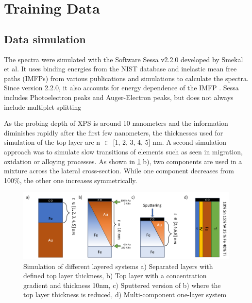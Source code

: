 

\section{Training Data}
\label{train_data}


\subsection{Data simulation}

The spectra were simulated with the Software Sessa v2.2.0 developed by Smekal et al. It uses binding energies from the NIST database and inelastic mean free paths (IMFPs) from various publications and simulations to calculate the spectra. Since version 2.2.0, it also accounts for energy dependence of the IMFP \cite{noauthor_nist_2010}.
Sessa includes Photoelectron peaks and Auger-Electron peaks, but does not always include multiplet splitting 

As the probing depth of XPS is around 10 nanometers and the information diminishes rapidly after the first few nanometers, the thicknesses used for simulation of the top layer are n $\in$ [1, 2, 3, 4, 5] nm. A second simulation approach was to simulate slow transitions of elements such as seen in migration, oxidation or alloying processes. As shown in \ref{fig:layers} b), two components are used in a mixture across the lateral cross-section. While one component decreases from 100\%, the other one increases symmetrically.

\begin{figure}
    \centering
    \includegraphics[width=\textwidth]{Figures/layers.png}
    \caption{Simulation of different layered systems a) Separated layers with defined top layer thickness, b) Top layer with a concentration gradient and thickness 10nm, c) Sputtered version of b) where the top layer thickness is reduced, d) Multi-component one-layer system}
    \label{fig:layers}
\end{figure}


